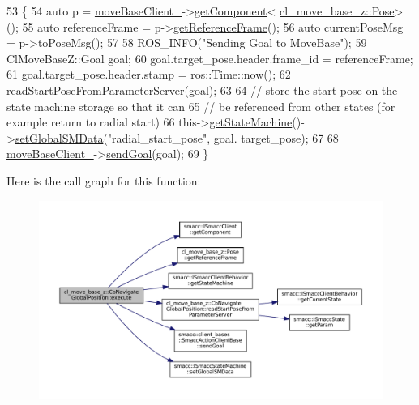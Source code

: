 \begin{DoxyCode}
53     \{
54         \textcolor{keyword}{auto} p = \hyperlink{classcl__move__base__z_1_1CbNavigateGlobalPosition_a460d6b43834cb52baa94d22cd3a6fd2b}{moveBaseClient\_}->\hyperlink{classsmacc_1_1ISmaccClient_adef78db601749ca63c19e74a27cb88cc}{getComponent}<
      \hyperlink{classcl__move__base__z_1_1Pose}{cl\_move\_base\_z::Pose}>();
55         \textcolor{keyword}{auto} referenceFrame = p->\hyperlink{classcl__move__base__z_1_1Pose_af8c2dc151e74aa8da6b283d1c8563051}{getReferenceFrame}();
56         \textcolor{keyword}{auto} currentPoseMsg = p->toPoseMsg();
57 
58         ROS\_INFO(\textcolor{stringliteral}{"Sending Goal to MoveBase"});
59         ClMoveBaseZ::Goal goal;
60         goal.target\_pose.header.frame\_id = referenceFrame;
61         goal.target\_pose.header.stamp = ros::Time::now();
62         \hyperlink{classcl__move__base__z_1_1CbNavigateGlobalPosition_a868b25f238e3781c9a2e44b4e1502fcc}{readStartPoseFromParameterServer}(goal);
63 
64         \textcolor{comment}{// store the start pose on the state machine storage so that it can}
65         \textcolor{comment}{// be referenced from other states (for example return to radial start)}
66         this->\hyperlink{classsmacc_1_1ISmaccClientBehavior_a9d55a85bf0a920033805a3c050de2019}{getStateMachine}()->\hyperlink{classsmacc_1_1ISmaccStateMachine_a8588f9e580fbb95b53e2bd2ca3ff1f98}{setGlobalSMData}(\textcolor{stringliteral}{"radial\_start\_pose"}, goal.
      target\_pose);
67 
68         \hyperlink{classcl__move__base__z_1_1CbNavigateGlobalPosition_a460d6b43834cb52baa94d22cd3a6fd2b}{moveBaseClient\_}->\hyperlink{classsmacc_1_1client__bases_1_1SmaccActionClientBase_a9c47a5094ac8afb01680307fe5eca922}{sendGoal}(goal);
69     \}
\end{DoxyCode}
Here is the call graph for this function\+:
\nopagebreak
\begin{figure}[H]
\begin{center}
\leavevmode
\includegraphics[width=350pt]{classcl__move__base__z_1_1CbNavigateGlobalPosition_a0b8525ea9e4388b27cb1f9b1e06a3b63_cgraph}
\end{center}
\end{figure}
